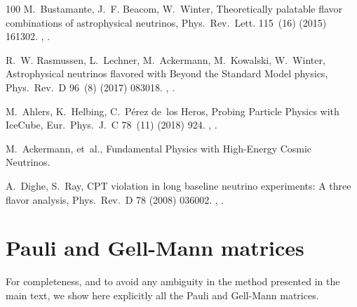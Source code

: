 \documentclass[final,5p,times,twocolumn]{elsarticle}
\begin{document}
\begin{thebibliography}{100}
M.~Bustamante, J.~F. Beacom, W.~Winter, {Theoretically palatable flavor
  combinations of astrophysical neutrinos}, Phys.\ Rev.\ Lett. 115~(16) (2015)
  161302.
\newblock \href {http://arxiv.org/abs/1506.02645} {},
  \href {http://dx.doi.org/10.1103/PhysRevLett.115.161302}
  {}.

R.~W. Rasmussen, L.~Lechner, M.~Ackermann, M.~Kowalski, W.~Winter,
  {Astrophysical neutrinos flavored with Beyond the Standard Model physics},
  Phys.\ Rev.\ D 96~(8) (2017) 083018.
\newblock \href {http://arxiv.org/abs/1707.07684} {},
  \href {http://dx.doi.org/10.1103/PhysRevD.96.083018}
  {}.

M.~Ahlers, K.~Helbing, C.~P{\'e}rez de~los Heros, {Probing Particle Physics
  with IceCube}, Eur.\ Phys.\ J.\ C 78~(11) (2018) 924.
\newblock \href {http://arxiv.org/abs/1806.05696} {},
  \href {http://dx.doi.org/10.1140/epjc/s10052-018-6369-9}
  {}.

M.~Ackermann, et~al., {Fundamental Physics with High-Energy Cosmic
  Neutrinos}\href {http://arxiv.org/abs/1903.04333} {}.

A.~Dighe, S.~Ray, {CPT violation in long baseline neutrino experiments: A three
  flavor analysis}, Phys.\ Rev.\ D 78 (2008) 036002.
\newblock \href {http://arxiv.org/abs/0802.0121} {},
  \href {http://dx.doi.org/10.1103/PhysRevD.78.036002}
  {}.

\end{thebibliography}



\appendix

\newpage

\section{Pauli and Gell-Mann matrices}
\label{appendix:matrices}

For completeness, and to avoid any ambiguity in the method presented in the main text, we show here explicitly all the Pauli and Gell-Mann matrices.  
\end{document}
